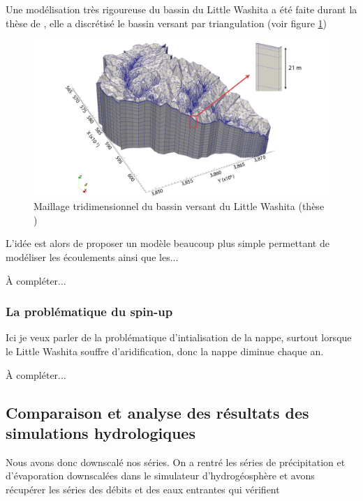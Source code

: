 \documentclass[a4paper,11pt]{article}
\numberwithin{equation}{section}
\begin{document}
Une modélisation très rigoureuse du bassin du Little Washita a été faite durant la thèse de \cite{maquin2016developpement}, elle a discrétisé le bassin versant par triangulation (voir figure \ref{fig-Little Washita 3D})

\begin{figure}[H]
	\label{fig-Little Washita 3D}
	\begin{center}
		\includegraphics[scale=0.2]{images/little_washita3D.png}
	\end{center}
	\caption{Maillage tridimensionnel du bassin versant du Little Washita (thèse \cite{maquin2016developpement})}
\end{figure}

L'idée est alors de proposer un modèle beaucoup plus simple permettant de modéliser les écoulements ainsi que les... 

À compléter...




\subsubsection{La problématique du spin-up}

Ici je veux parler de la problématique d'intialisation de la nappe, surtout lorsque le Little Washita souffre d'aridification, donc la nappe diminue chaque an. 

À compléter...

\subsection{Comparaison et analyse des résultats des simulations hydrologiques}

Nous avons donc downscalé nos séries. On a rentré les séries de précipitation et d'évaporation downscalées dans le simulateur d'hydrogéosphère et avons récupérer les séries des débits et des eaux entrantes qui vérifient
\end{document}
